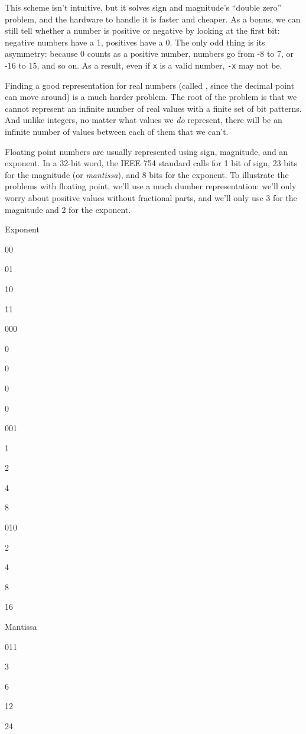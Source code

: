 \documentclass{book}
\begin{document}
This scheme isn't intuitive, but it solves sign and magnitude's ``double
zero'' problem, and the hardware to handle it is faster and cheaper. As
a bonus, we can still tell whether a number is positive or negative by
looking at the first bit: negative numbers have a 1, positives have a 0.
The only odd thing is its asymmetry: because 0 counts as a positive
number, numbers go from -8 to 7, or -16 to 15, and so on. As a result,
even if \texttt{x} is a valid number, \texttt{-x} may not be.

Finding a good representation for real numbers (called
, since the decimal
point can move around) is a much harder problem. The root of the problem
is that we cannot represent an infinite number of real values with a
finite set of bit patterns. And unlike integers, no matter what values
we \emph{do} represent, there will be an infinite number of values
between each of them that we can't.

Floating point numbers are usually represented using sign, magnitude,
and an exponent. In a 32-bit word, the IEEE 754 standard calls for 1 bit
of sign, 23 bits for the magnitude (or \emph{mantissa}), and 8 bits for
the exponent. To illustrate the problems with floating point, we'll use
a much dumber representation: we'll only worry about positive values
without fractional parts, and we'll only use 3 for the magnitude and 2
for the exponent.

Exponent

00

01

10

11

000

0

0

0

0

001

1

2

4

8

010

2

4

8

16

Mantissa

011

3

6

12

24
\end{document}
